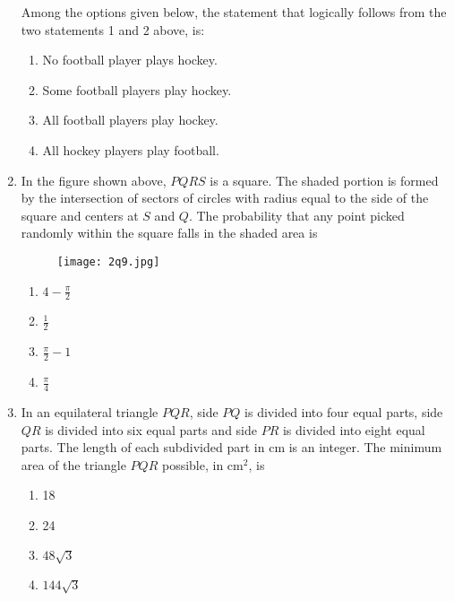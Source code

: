 \documentclass[journal,12pt,onecolumn]{article}
\theoremstyle{remark}
\begin{document}
\begin{enumerate}
Among the options given below, the statement that logically follows from the two statements 1 and 2 above, is:

\hfill{}

\begin{enumerate}
    \item No football player plays hockey.
    \item Some football players play hockey.
    \item All football players play hockey.
    \item All hockey players play football.
\end{enumerate}

\item In the figure  shown above, $PQRS$ is a square. The shaded portion is formed by the intersection of sectors of circles with radius equal to the side of the square and centers at $S$ and $Q$.
The probability that any point picked randomly within the square falls in the shaded area is \underline{\hspace{2cm}}
\begin{figure}[H]
    \centering
    \texttt{[image: 2q9.jpg]}
    \caption{}
    \label{fig:q9}
\end{figure}

\hfill{}

\begin{multicols}{2}
\begin{enumerate}
    \item $4-\frac{\pi}{2}$
    \item $\frac{1}{2}$
    \item $\frac{\pi}{2}-1$
    \item $\frac{\pi}{4}$
\end{enumerate}
\end{multicols}

\item In an equilateral triangle $PQR$, side $PQ$ is divided into four equal parts, side $QR$ is divided into six equal parts and side $PR$ is divided into eight equal parts. The length of each subdivided part in cm is an integer.
The minimum area of the triangle $PQR$ possible, in cm$^2$, is

\hfill{}

\begin{multicols}{2}
\begin{enumerate}
    \item 18
    \item 24
    \item $48\sqrt{3}$
    \item $144\sqrt{3}$
\end{enumerate}
\end{multicols}
\end{enumerate}
\end{document}
